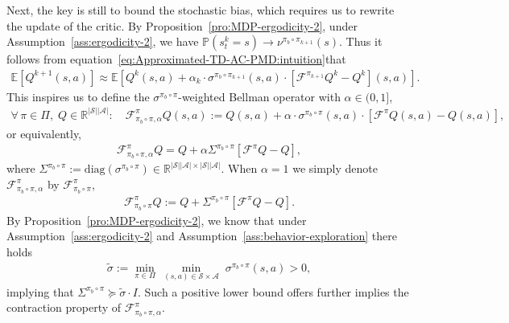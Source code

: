 \documentclass[10pt]{article}
\newcommand{\calA}{\mathcal{A}}
\newcommand{\calS}{\mathcal{S}}
\newcommand{\calF}{\mathcal{F}}
\newcommand{\E}{\mathbb{E}}
\renewcommand{\P}{\mathbb{P}}
\newcommand{\ls}{\left}
\newcommand{\rs}{\right}
\theoremstyle{plain}
\theoremstyle{definition}
\begin{document}
Next, the key is still to bound the stochastic bias, which requires us to rewrite the update of the critic.  By Proposition~\ref{pro:MDP-ergodicity-2}, under Assumption~\ref{ass:ergodicity-2}, we have $\P(s_t^k = s) \to \nu^{\pi_b\circ\pi_{k+1}}(s)$. Thus it follows from equation~\eqref{eq:Approximated-TD-AC-PMD:intuition}that
\begin{align*}
    \E\ls[ Q^{k+1}(s,a) \rs] \approx \E\ls[ Q^k(s,a) + \alpha_k \cdot \sigma^{\pi_b\circ\pi_{k+1}}(s,a) \cdot \ls[ \calF^{\pi_{k+1}} Q^k - Q^k \rs](s,a) \rs].
\end{align*}
This inspires us to  define the $\sigma^{\pi_b\circ\pi}$-weighted Bellman operator with $\alpha \in (0,1]$,
\begin{align*}
    \forall\, \pi\in\Pi, \; Q\in\mathbb{R}^{|\calS||\calA|}: \quad  \calF^{\pi}_{\pi_b\circ\pi, \alpha} Q(s,a) := Q(s,a) + \alpha \cdot \sigma^{\pi_b\circ\pi}(s,a) \cdot \ls[ \calF^{\pi} Q(s,a) - Q(s,a) \rs],
\end{align*}
or equivalently,
\begin{align*}
    \calF^{\pi}_{\pi_b\circ\pi, \alpha} Q = Q + \alpha\Sigma^{\pi_b\circ\pi} \ls[ \calF^{\pi} Q - Q \rs],
\end{align*}
where $\Sigma^{\pi_b\circ\pi} := \mbox{diag}(\sigma^{\pi_b\circ\pi}) \in \mathbb{R}^{|\calS||\calA| \times |\calS||\calA|}$. When $\alpha = 1$ we simply denote $\calF^{\pi}_{\pi_b\circ\pi, \alpha}$ by $\calF^{\pi}_{\pi_b\circ\pi}$,
\begin{align*}
    \calF^\pi_{\pi_b\circ\pi} Q := Q + \Sigma^{\pi_b\circ\pi} [\calF^\pi Q - Q].
\end{align*}
By Proposition~\ref{pro:MDP-ergodicity-2}, we know that under Assumption~\ref{ass:ergodicity-2} and Assumption~\ref{ass:behavior-exploration} there holds
\begin{align*}
    \tilde\sigma := \min_{\pi\in\Pi} \, \min_{(s,a)\in\calS\times\calA} \; \sigma^{\pi_b\circ\pi}(s,a) > 0,
\end{align*}
implying that $\Sigma^{\pi_b\circ\pi} \succeq \tilde\sigma \cdot I$. Such a positive lower bound offers further implies the contraction property of $\calF^{\pi}_{\pi_b\circ\pi, \alpha}$.
\end{document}
